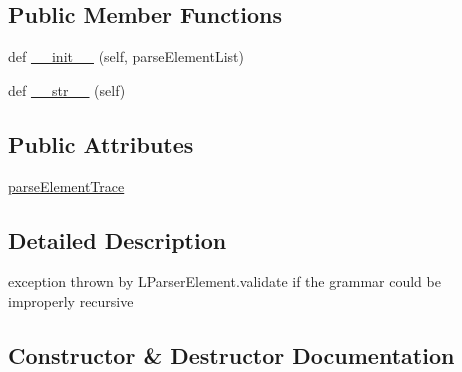 \subsection*{Public Member Functions}
\begin{DoxyCompactItemize}
\item 
def \hyperlink{classpkg__resources_1_1__vendor_1_1pyparsing_1_1RecursiveGrammarException_ab0f03a877e4f179218acae0ce0c7ddbb}{\+\_\+\+\_\+init\+\_\+\+\_\+} (self, parse\+Element\+List)
\item 
def \hyperlink{classpkg__resources_1_1__vendor_1_1pyparsing_1_1RecursiveGrammarException_a704085665e38509282981b636097fadd}{\+\_\+\+\_\+str\+\_\+\+\_\+} (self)
\end{DoxyCompactItemize}
\subsection*{Public Attributes}
\begin{DoxyCompactItemize}
\item 
\hyperlink{classpkg__resources_1_1__vendor_1_1pyparsing_1_1RecursiveGrammarException_ae82bfd4097aa1150bf622d4db2b70434}{parse\+Element\+Trace}
\end{DoxyCompactItemize}


\subsection{Detailed Description}
\begin{DoxyVerb}exception thrown by L{ParserElement.validate} if the grammar could be improperly recursive\end{DoxyVerb}
 

\subsection{Constructor \& Destructor Documentation}
\mbox{\label{classpkg__resources_1_1__vendor_1_1pyparsing_1_1RecursiveGrammarException_ab0f03a877e4f179218acae0ce0c7ddbb}} 
